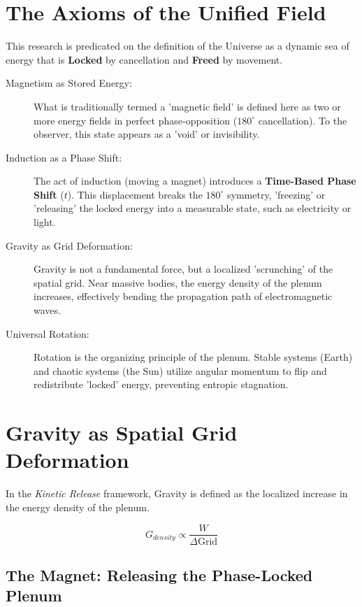 \documentclass[11pt]{article}
\begin{document}
\section*{The Axioms of the Unified Field}
This research is predicated on the definition of the Universe as a dynamic sea of energy that is \textbf{Locked} by cancellation and \textbf{Freed} by movement.

\begin{description}
    \item[Magnetism as Stored Energy:] What is traditionally termed a 'magnetic field' is defined here as two or more energy fields in perfect phase-opposition ($180^\circ$ cancellation). To the observer, this state appears as a 'void' or invisibility.
    
    \item[Induction as a Phase Shift:] The act of induction (moving a magnet) introduces a \textbf{Time-Based Phase Shift} ($t$). This displacement breaks the $180^\circ$ symmetry, 'freezing' or 'releasing' the locked energy into a measurable state, such as electricity or light.
    
    \item[Gravity as Grid Deformation:] Gravity is not a fundamental force, but a localized 'scrunching' of the spatial grid. Near massive bodies, the energy density of the plenum increases, effectively bending the propagation path of electromagnetic waves.
    
    \item[Universal Rotation:] Rotation is the organizing principle of the plenum. Stable systems (Earth) and chaotic systems (the Sun) utilize angular momentum to flip and redistribute 'locked' energy, preventing entropic stagnation.
\end{description}

\section*{Gravity as Spatial Grid Deformation}
In the \textit{Kinetic Release} framework, Gravity is defined as the localized increase in the energy density of the plenum. 

\begin{equation}
    G_{density} \propto \frac{W}{\Delta \text{Grid}}
\end{equation}

\subsection*{The Magnet: Releasing the Phase-Locked Plenum}
\end{document}
